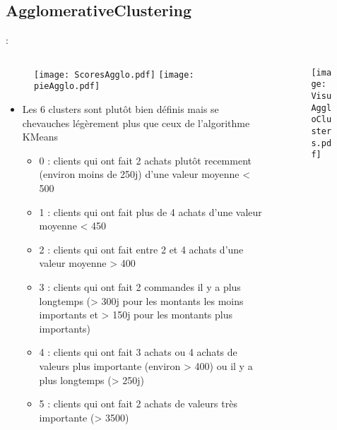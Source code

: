 \documentclass[8pt,aspectratio=169,hyperref={unicode=true}]{beamer}
\begin{document}
\subsection{AgglomerativeClustering}
\begin{frame}{\insertsection: \insertsubsection}
    \begin{columns}
        \begin{column}{.55\textwidth}
            \begin{figure}
                \texttt{[image: ScoresAgglo.pdf]}
                \texttt{[image: pieAgglo.pdf]}
            \end{figure}
            \begin{itemize}
                \footnotesize
                \item Les 6 clusters sont plutôt bien définis mais se chevauches légèrement plus que ceux de l'algorithme KMeans
                      \begin{itemize}
                          \scriptsize
                          \item 0 : clients qui ont fait 2 achats plutôt recemment (environ moins de 250j) d'une valeur moyenne < 500
                          \item 1 : clients qui ont fait plus de 4 achats d'une valeur moyenne < 450
                          \item 2 : clients qui ont fait entre 2 et 4 achats d'une valeur moyenne > 400
                          \item 3 : clients qui ont fait 2 commandes il y a plus longtemps (> 300j pour les montants les moins importants et > 150j pour les montants plus importants)
                          \item 4 : clients qui ont fait 3 achats ou 4 achats de valeurs plus importante (environ > 400) ou il y a plus longtemps (> 250j)
                          \item 5 : clients qui ont fait 2 achats de valeurs très importante (> 3500)
                      \end{itemize}
            \end{itemize}
        \end{column}
        \begin{column}{.45\textwidth}
            \begin{figure}
                \texttt{[image: VisuAggloClusters.pdf]}
            \end{figure}
        \end{column}
    \end{columns}
\end{frame}
\end{document}
